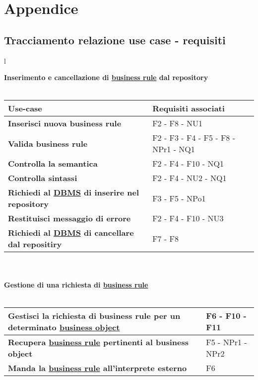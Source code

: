 \chapter{Appendice}
\section{Tracciamento relazione use case - requisiti}
\large{
\begin{tabular}{l}

\textbf{Inserimento e cancellazione di \underline{business rule} dal repository}\\ \\

\begin{tabular}{||p{8cm}||p{4cm}||} \hline
\textbf{Use-case} & \textbf{Requisiti associati} \\ \hline
\textbf{Inserisci nuova business rule} & F2 - F8 - NU1 \\ \hline
\textbf{Valida business rule} & F2 - F3 - F4 - F5 - F8 - NPr1 - NQ1 \\ \hline
\textbf{Controlla la semantica} & F2 - F4 - F10 - NQ1\\ \hline
\textbf{Controlla sintassi} & F2 - F4 - NU2 - NQ1\\ \hline
\textbf{Richiedi al \underline{DBMS} di inserire nel repository} & F3 -  F5 -  NPo1 \\ \hline
\textbf{Restituisci messaggio di errore} & F2 - F4 - F10 - NU3 \\ \hline
\textbf{Richiedi al \underline{DBMS} di cancellare dal repositiry} & F7 - F8 \\ \hline
\end{tabular} \\ \\

\textbf {Gestione di una richiesta di \underline{business rule}}\\ \\

\begin{tabular}{||p{8cm}||p{4cm}||} \hline
\textbf{Gestisci la richiesta di business rule per un determinato \underline{business object}} & F6 - F10 - F11 \\ \hline
\textbf{Recupera \underline{business rule} pertinenti al business object} & F5 - NPr1 - NPr2 \\ \hline
\textbf{Manda la \underline{business rule} all'interprete esterno} & F6 \\ \hline
\end{tabular} \\
\end{tabular}
}

